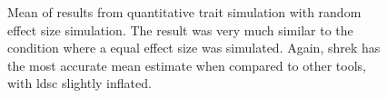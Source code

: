 \begin{figure}
{				
				\label{fig:ldscInQtRandMean}
			}
			\caption[Quantitative Trait with Random Effect Size Simulation Result(Mean)]
			{Mean of results from quantitative trait simulation with random effect size simulation.
				The result was very much similar to the condition where a equal effect size was simulated.
				Again, \gls{shrek} has the most accurate mean estimate when compared to other tools, with \gls{ldsc} slightly inflated.} 
			\label{fig:QtRandMean}
		\end{figure}
		
